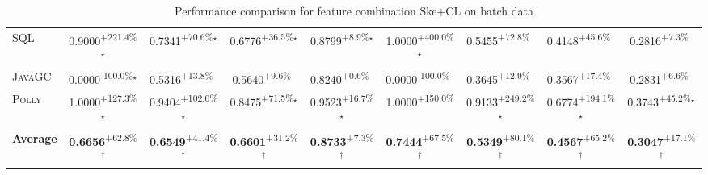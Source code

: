 \begin{table}[htbp]
\begin{tabular}{l|cccc|cccc}
\textsc{SQL} & \cellcolor{green!30}0.9000\textsuperscript{+221.4\%}$^\star$ & \cellcolor{green!30}0.7341\textsuperscript{+70.6\%}$^\star$ & \cellcolor{green!30}0.6776\textsuperscript{+36.5\%}$^\star$ & \cellcolor{green!30}0.8799\textsuperscript{+8.9\%}$^\star$ & \cellcolor{green!30}1.0000\textsuperscript{+400.0\%}$^\star$ & \cellcolor{green!30}0.5455\textsuperscript{+72.8\%}$^{\,\,\,}$ & \cellcolor{green!30}0.4148\textsuperscript{+45.6\%}$^{\,\,\,}$ & \cellcolor{green!30}0.2816\textsuperscript{+7.3\%}$^{\,\,\,}$ \\
\textsc{JavaGC} & \cellcolor{red!30}0.0000\textsuperscript{-100.0\%}$^\star$ & \cellcolor{green!30}0.5316\textsuperscript{+13.8\%}$^{\,\,\,}$ & \cellcolor{green!30}0.5640\textsuperscript{+9.6\%}$^{\,\,\,}$ & \cellcolor{green!30}0.8240\textsuperscript{+0.6\%}$^{\,\,\,}$ & \cellcolor{red!30}0.0000\textsuperscript{-100.0\%}$^{\,\,\,}$ & \cellcolor{green!30}0.3645\textsuperscript{+12.9\%}$^{\,\,\,}$ & \cellcolor{green!30}0.3567\textsuperscript{+17.4\%}$^{\,\,\,}$ & \cellcolor{green!30}0.2831\textsuperscript{+6.6\%}$^{\,\,\,}$ \\
\textsc{Polly} & \cellcolor{green!30}1.0000\textsuperscript{+127.3\%}$^\star$ & \cellcolor{green!30}0.9404\textsuperscript{+102.0\%}$^\star$ & \cellcolor{green!30}0.8475\textsuperscript{+71.5\%}$^\star$ & \cellcolor{green!30}0.9523\textsuperscript{+16.7\%}$^\star$ & \cellcolor{green!30}1.0000\textsuperscript{+150.0\%}$^{\,\,\,}$ & \cellcolor{green!30}0.9133\textsuperscript{+249.2\%}$^\star$ & \cellcolor{green!30}0.6774\textsuperscript{+194.1\%}$^\star$ & \cellcolor{green!30}0.3743\textsuperscript{+45.2\%}$^\star$ \\
\hline
\textbf{Average} & \cellcolor{green!30}\textbf{0.6656}\textsuperscript{+62.8\%}$^\dagger$ & \cellcolor{green!30}\textbf{0.6549}\textsuperscript{+41.4\%}$^\dagger$ & \cellcolor{green!30}\textbf{0.6601}\textsuperscript{+31.2\%}$^\dagger$ & \cellcolor{green!30}\textbf{0.8733}\textsuperscript{+7.3\%}$^\dagger$ & \cellcolor{green!30}\textbf{0.7444}\textsuperscript{+67.5\%}$^\dagger$ & \cellcolor{green!30}\textbf{0.5349}\textsuperscript{+80.1\%}$^\dagger$ & \cellcolor{green!30}\textbf{0.4567}\textsuperscript{+65.2\%}$^\dagger$ & \cellcolor{green!30}\textbf{0.3047}\textsuperscript{+17.1\%}$^\dagger$ \\
\hline
\end{tabular}
\caption{Performance comparison for feature combination Ske+CL on batch data}
\label{tab:combo_Ske_CL_performance_batch}
\end{table}